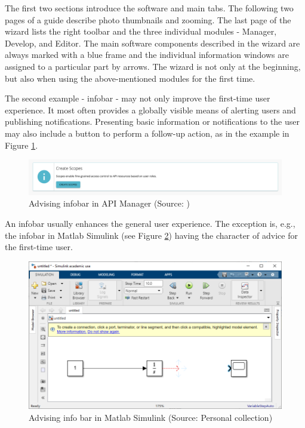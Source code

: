 \documentclass[a4paper,10pt,twoside]{article}
\begin{document}
\newpage
\noindent The first two sections introduce the software and main tabs. The following two pages of a guide describe photo thumbnails and zooming. The last page of the wizard lists the right toolbar and the three individual modules - Manager, Develop, and Editor. The main software components described in the wizard are always marked with a blue frame and the individual information windows are assigned to a particular part by arrows. The wizard is not only at the beginning, but also when using the above-mentioned modules for the first time.

The second example - infobar - may not only improve the first-time user experience. It most often provides a globally visible means of alerting users and publishing notifications. Presenting basic information or notifications to the user may also include a button to perform a follow-up action, as in the example in Figure \ref{fig:info_infobar_1}.

\begin{figure}[hbt!] 
\begin{center}
\includegraphics[width=17cm]{../pictures/info_infobar_1.png} 
\caption[Advising info bar in API Manager]{Advising infobar in API Manager (Source: \cite{githubio})}
\label{fig:info_infobar_1}
\end{center}
\end{figure}

\noindent An infobar usually enhances the general user experience. The exception is, e.g., the infobar in Matlab Simulink (see Figure \ref{fig:info_advice_infobar}) having the character of advice for the first-time user.

\begin{figure}[hbt!] 
\begin{center}
\includegraphics[width=17cm]{../pictures/info_advice_infobar.png} 
\caption[Advising info bar in Matlab Simulink]{Advising  info bar in Matlab Simulink (Source: Personal collection)}
\label{fig:info_advice_infobar}
\end{center}
\end{figure}
\end{document}
